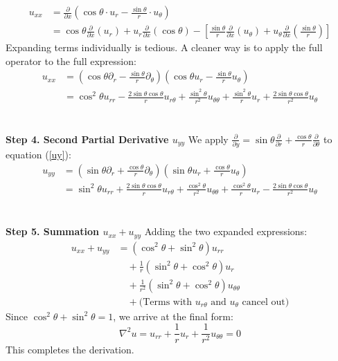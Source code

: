 \documentclass{article}
\begin{document}
\begin{align*}
	u_{xx} & = \frac{\partial}{\partial x}\left( \cos\theta \cdot u_r - \frac{\sin\theta}{r} \cdot u_\theta \right)                                                                                                                                          \\
	       & = \cos\theta \frac{\partial}{\partial x}(u_r) + u_r \frac{\partial}{\partial x}(\cos\theta) - \left[ \frac{\sin\theta}{r} \frac{\partial}{\partial x}(u_\theta) + u_\theta \frac{\partial}{\partial x}\left(\frac{\sin\theta}{r}\right) \right]
\end{align*}
Expanding terms individually is tedious. A cleaner way is to apply the full operator to the full expression:
\begin{align*}
	u_{xx} & = \left( \cos\theta \partial_r - \frac{\sin\theta}{r} \partial_\theta \right) \left( \cos\theta u_r - \frac{\sin\theta}{r} u_\theta \right)                                           \\
	       & = \cos^2\theta u_{rr} - \frac{2\sin\theta\cos\theta}{r}u_{r\theta} + \frac{\sin^2\theta}{r^2}u_{\theta\theta} + \frac{\sin^2\theta}{r}u_r + \frac{2\sin\theta\cos\theta}{r^2}u_\theta
\end{align*}
\\
\\
\textbf{Step 4. Second Partial Derivative $u_{yy}$}
We apply $\frac{\partial}{\partial y} = \sin\theta \frac{\partial}{\partial r} + \frac{\cos\theta}{r} \frac{\partial}{\partial \theta}$ to equation (\ref{uy}):
\begin{align*}
	u_{yy} & = \left( \sin\theta \partial_r + \frac{\cos\theta}{r} \partial_\theta \right) \left( \sin\theta u_r + \frac{\cos\theta}{r} u_\theta \right)                                           \\
	       & = \sin^2\theta u_{rr} + \frac{2\sin\theta\cos\theta}{r}u_{r\theta} + \frac{\cos^2\theta}{r^2}u_{\theta\theta} + \frac{\cos^2\theta}{r}u_r - \frac{2\sin\theta\cos\theta}{r^2}u_\theta
\end{align*}
\\
\\
\textbf{Step 5. Summation $u_{xx} + u_{yy}$}
Adding the two expanded expressions:
\begin{align*}
	u_{xx} + u_{yy} & = (\cos^2\theta + \sin^2\theta)u_{rr}                                             \\
	                & \quad + \frac{1}{r}(\sin^2\theta + \cos^2\theta)u_r                               \\
	                & \quad + \frac{1}{r^2}(\sin^2\theta + \cos^2\theta)u_{\theta\theta}                \\
	                & \quad + \text{(Terms with } u_{r\theta} \text{ and } u_\theta \text{ cancel out)}
\end{align*}
Since $\cos^2\theta + \sin^2\theta = 1$, we arrive at the final form:
\[
	\nabla^2 u = u_{rr} + \frac{1}{r}u_r + \frac{1}{r^2}u_{\theta\theta} = 0
\]
This completes the derivation.
\end{document}
